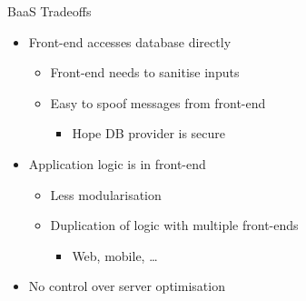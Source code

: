 \documentclass{slide}
\begin{document}
\begin{frame}{BaaS Tradeoffs}
\vspace{1pt}
{\huge
\begin{itemize}
     \item<1-> Front-end accesses database directly
     \vspace{-2pt}
    \begin{itemize}
        \LARGE\item Front-end needs to sanitise inputs
        \vspace{2pt}
        \LARGE\item Easy to spoof messages from front-end
        \begin{itemize}
            \Large\item Hope DB provider is secure
        \end{itemize}
    \end{itemize}
    \vspace{1mm}
    \item<2-> Application logic is in front-end
    \vspace{-2pt}
    \begin{itemize}
        \LARGE\item Less modularisation
        \vspace{5pt}
        \LARGE\item Duplication of logic with multiple front-ends
        \begin{itemize}
            \Large\item Web, mobile, \dots
        \end{itemize}
    \end{itemize}
    \item<3-> No control over server optimisation
\end{itemize}
}
\end{frame}
\end{document}
